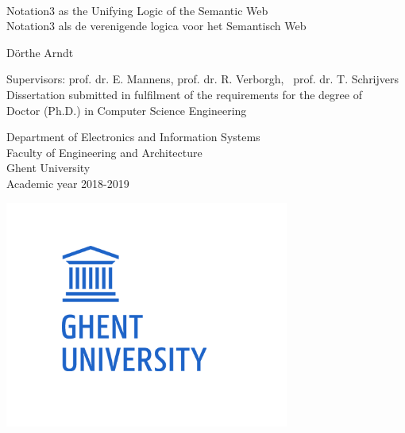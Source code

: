 
{\large \ \vspace{0.25\textheight} \\

\hspace{-\parindent}Notation3 as the Unifying Logic of the Semantic Web\\

\hspace{-\parindent}Notation3 als de verenigende logica voor het Semantisch Web


\vspace{0.5cm}
\hspace{-\parindent}D\"orthe Arndt

}

\vspace*{\fill}
\hspace{-\parindent}Supervisors: prof. dr. E. Mannens, prof. dr. R. Verborgh,~ prof. dr. T. Schrijvers\\
\hspace{-\parindent}Dissertation submitted in fulfilment of the requirements for the degree of\\
\hspace{-\parindent}Doctor (Ph.D.) in Computer Science Engineering\\


\vspace{0.5cm}

\hspace{-\parindent}\begin{minipage}{0.7\textwidth}
  \hspace{-\parindent}Department of Electronics and Information Systems\\
  \hspace{-\parindent}Faculty of Engineering and Architecture\\
  \hspace{-\parindent}Ghent University\\
  \hspace{-\parindent}Academic year 2018-2019
\end{minipage}
\begin{minipage}{0.3\textwidth}
  \begin{flushright}
    \includegraphics[width=0.7\textwidth]{./figures/logo-ugent}
  \end{flushright}
\end{minipage}

